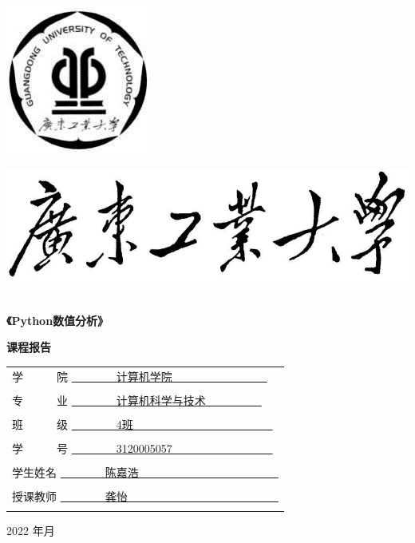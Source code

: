 \documentclass[UTF8]{ctexart}
\date{}
\begin{document}
\pagestyle{empty}
\includegraphics[]{guangdong.jpg}%
\begin{center}
    \includegraphics[scale=0.5]{gdut.jpg}%
\end{center}
\begin{center}
	\quad \\
	\heiti \fontsize{22}{18} \textbf{《Python数值分析》}
    \vskip 1.0cm
\end{center}
\begin{center}
	\heiti \fontsize{22}{18} \textbf{课程报告}
	\vskip 2.5cm
\end{center}
\begin{center}
	\begin{tabular}{l}
		
		学~~~~~~院 \underline{~~~~~~~~计算机学院~~~~~~~~~~~~~~~~~}\\\\
		专~~~~~~业 \underline{~~~~~~~~计算机科学与技术~~~~~~~~~~}\\\\
		班~~~~~~级 \underline{~~~~~~~~4班~~~~~~~~~~~~~~~~~~~~~~~~~}\\\\
    学~~~~~~号 \underline{~~~~~~~~3120005057~~~~~~~~~~~~~~~~~~}\\\\
    学生姓名 \underline{~~~~~~~~陈嘉浩~~~~~~~~~~~~~~~~~~~~~~~~~}\\\\
		授课教师 \underline{~~~~~~~~龚怡~~~~~~~~~~~~~~~~~~~~~~~~~~~}\\\\

	\end{tabular}
\end{center}
\begin{center}
        \vskip 1cm
		{2022} 年{}月
		
\end{center}
\newpage
\end{document}
